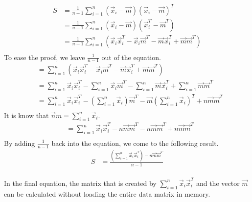 \documentclass[a4paper,12px]{article}
\begin{document}
\begin{equation}
\begin{aligned}
S &= \frac{1}{n-1} \sum\limits_{i=1}^{n} (\vec x_i - \vec m)(\vec x_i - \vec m)^T\\
  &= \frac{1}{n-1} \sum\limits_{i=1}^{n} (\vec x_i - \vec m)(\vec x_i^T - \vec m^T)\\
  &= \frac{1}{n-1} \sum\limits^n_{i=1} \left(\vec x_i \vec x_i^T - \vec x_i \vec m^T -
                                             \vec m \vec x_i^T + \vec m \vec m ^T\right) \\
\end{aligned}
\end{equation}
To ease the proof, we leave $\frac{1}{n-1}$ out of the equation.
\begin{equation}
\begin{aligned}
  &= \sum\limits^n_{i=1} \left(\vec x_i \vec x_i^T - \vec x_i \vec m^T - \vec m \vec
    x_i^T + \vec m \vec m^T\right)\\
  &= \sum\limits^n_{i=1} \vec x_i \vec x_i^T - \sum\limits^n_{i=1} \vec x_i \vec m^T - \sum\limits^n_{i=1} \vec m \vec
    x_i^T + \sum\limits^n_{i=1} \vec m \vec m^T \\
  &= \sum\limits^n_{i=1} \vec x_i \vec x_i^T - \left(\sum\limits^n_{i=1} \vec x_i\right)
    \vec m^T - \vec m \left(\sum\limits^n_{i=1} \vec x_i\right)^T + n \vec m \vec m^T\\
\end{aligned}
\end{equation}
It is know that $\vec nm = \sum\limits_{i=1}^n \vec x_i$.
\begin{equation}
\begin{aligned}
    &= \sum\limits^n_{i=1} \vec x_i \vec x_i^T - n \vec m \vec m^T - n \vec m \vec
    m^T + n \vec m \vec m^T \\
\end{aligned}
\end{equation}
By adding $\frac{1}{n-1}$ back into the equation, we come to the following result.
\begin{equation}
\begin{aligned}
    S &= \frac{\left(\sum\limits^n_{i=1} \vec x_i \vec x_i^T \right) - n \vec m \vec m^T}{n-1} \\
\end{aligned}
\end{equation}

In the final equation, the matrix that is created by $\sum\limits_{i=1}^n \vec
x_i \vec x_i^T$ and the vector $\vec m$ can be calculated without loading the
entire data matrix in memory.
\end{document}
